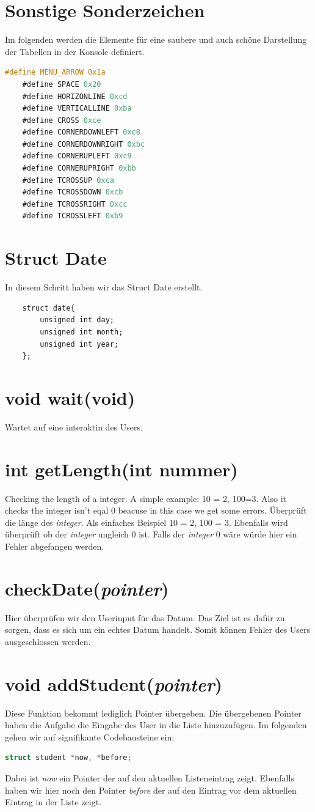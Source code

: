 \documentclass[a4paper, 11pt, oneside]{book} %
\begin{document}
\section{Sonstige Sonderzeichen}
Im folgenden werden die Elemente für eine saubere und auch schöne Darstellung der Tabellen in der Konsole definiert.
\begin{lstlisting}[language=C]
	#define MENU_ARROW 0x1a
	#define SPACE 0x20
	#define HORIZONLINE 0xcd
	#define VERTICALLINE 0xba
	#define CROSS 0xce
	#define CORNERDOWNLEFT 0xc8 
	#define CORNERDOWNRIGHT 0xbc 
	#define CORNERUPLEFT 0xc9 
	#define CORNERUPRIGHT 0xbb 
	#define TCROSSUP 0xca 
	#define TCROSSDOWN 0xcb 
	#define TCROSSRIGHT 0xcc 
	#define TCROSSLEFT 0xb9 
\end{lstlisting}

\section{Struct Date}
In diesem Schritt haben wir das Struct Date erstellt.
\begin{lstlisting}
	struct date{
        unsigned int day;
        unsigned int month;
        unsigned int year;
	};
\end{lstlisting}
\section{void wait(void)}
Wartet auf eine interaktin des Users.
\section{int getLength(int nummer)}
Checking the length of a integer. A simple example: 10 = 2, 100=3. Also it checks the integer isn't eqal 0 beacuse in this case we get some errors.
Überprüft die länge des \textit{integer}. Als einfaches Beispiel 10 = 2, 100 = 3. Ebenfalls wird überprüft ob der \textit{integer} ungleich 0 ist. Falls der \textit{integer} 0 wäre würde hier ein Fehler abgefangen werden.

\section{checkDate(\textit{pointer})}
Hier überprüfen wir den Userinput für das Datum. Das Ziel ist es dafür zu sorgen, dass es sich um ein echtes Datum handelt. Somit können Fehler des Users ausgeschlossen werden.

\section{void addStudent(\textit{pointer})}
Diese Funktion bekommt lediglich Pointer übergeben. Die übergebenen Pointer haben die Aufgabe die Eingabe des User in die Liste hinzuzufügen. Im folgenden gehen wir auf signifikante Codebausteine ein:
\begin{lstlisting}[language=C]
	struct student *now, *before;
\end{lstlisting}
Dabei ist \textit{now} ein Pointer der auf den aktuellen Listeneintrag zeigt. Ebenfalls haben wir hier noch den Pointer \textit{before} der auf den Eintrag vor dem aktuellen Eintrag in der Liste zeigt.
\end{document}
